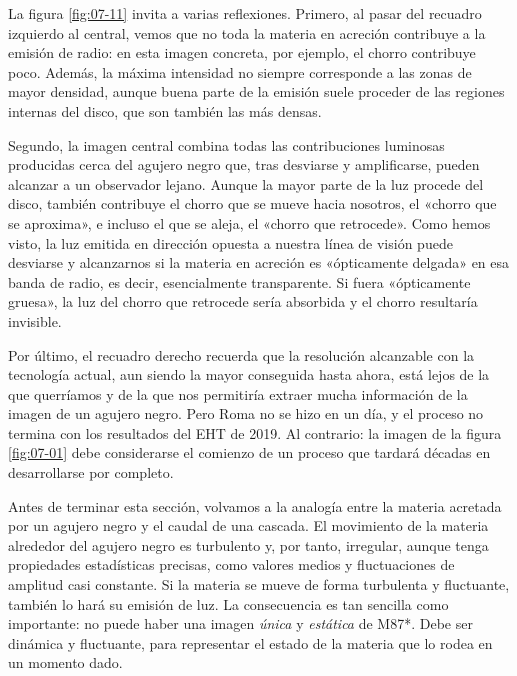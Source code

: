 La figura \ref{fig:07-11} invita a varias reflexiones. Primero, al pasar del recuadro izquierdo al central, vemos que no toda la materia en acreción contribuye a la emisión de radio: en esta imagen concreta, por ejemplo, el chorro contribuye poco. Además, la máxima intensidad no siempre corresponde a las zonas de mayor densidad, aunque buena parte de la emisión suele proceder de las regiones internas del disco, que son también las más densas.

Segundo, la imagen central combina todas las contribuciones luminosas producidas cerca del agujero negro que, tras desviarse y amplificarse, pueden alcanzar a un observador lejano. Aunque la mayor parte de la luz procede del disco, también contribuye el chorro que se mueve hacia nosotros, el «chorro que se aproxima», e incluso el que se aleja, el «chorro que retrocede». Como hemos visto, la luz emitida en dirección opuesta a nuestra línea de visión puede desviarse y alcanzarnos si la materia en acreción es «ópticamente delgada» en esa banda de radio, es decir, esencialmente transparente. Si fuera «ópticamente gruesa», la luz del chorro que retrocede sería absorbida y el chorro resultaría invisible.

Por último, el recuadro derecho recuerda que la resolución alcanzable con la tecnología actual, aun siendo la mayor conseguida hasta ahora, está lejos de la que querríamos y de la que nos permitiría extraer mucha información de la imagen de un agujero negro. Pero Roma no se hizo en un día, y el proceso no termina con los resultados del EHT de 2019. Al contrario: la imagen de la figura \ref{fig:07-01} debe considerarse el comienzo de un proceso que tardará décadas en desarrollarse por completo.

Antes de terminar esta sección, volvamos a la analogía entre la materia acretada por un agujero negro y el caudal de una cascada. El movimiento de la materia alrededor del agujero negro es turbulento y, por tanto, irregular, aunque tenga propiedades estadísticas precisas, como valores medios y fluctuaciones de amplitud casi constante. Si la materia se mueve de forma turbulenta y fluctuante, también lo hará su emisión de luz. La consecuencia es tan sencilla como importante: no puede haber una imagen \emph{única} y \emph{estática} de M87*. Debe ser dinámica y fluctuante, para representar el estado de la materia que lo rodea en un momento dado.

